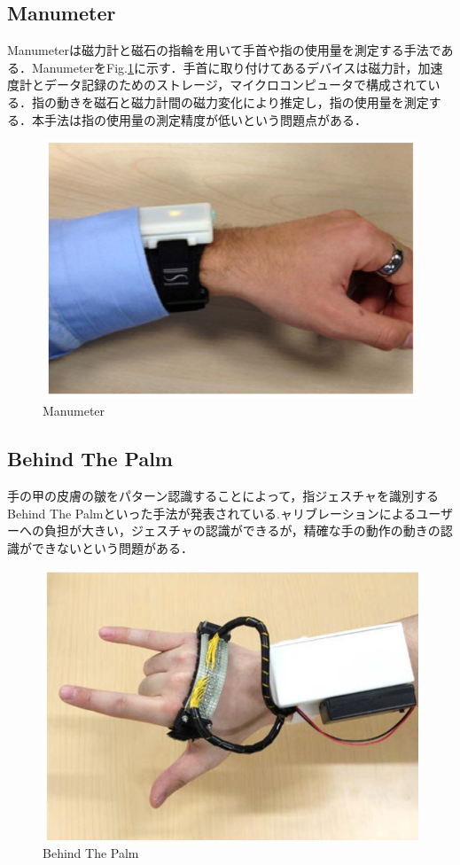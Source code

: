 \subsection*{Manumeter}
Manumeter\cite{Friedman2014}は磁力計と磁石の指輪を用いて手首や指の使用量を測定する手法である．ManumeterをFig.\ref{fig:Manumeter}に示す．手首に取り付けてあるデバイスは磁力計，加速度計とデータ記録のためのストレージ，マイクロコンピュータで構成されている．指の動きを磁石と磁力計間の磁力変化により推定し，指の使用量を測定する．本手法は指の使用量の測定精度が低いという問題点がある．
\begin{figure}[H]
  \centering
  \includegraphics[width=0.6\linewidth]{fig/ch1/manumeter}
  \caption{Manumeter}
  \label{fig:Manumeter}
\end{figure}

\subsection*{Behind The Palm}
手の甲の皮膚の皺をパターン認識することによって，指ジェスチャを識別するBehind The Palm\cite{Recognition2017}といった手法が発表されている.ャリブレーションによるユーザーへの負担が大きい，ジェスチャの認識ができるが，精確な手の動作の動きの認識ができないという問題がある．
\begin{figure}[H]
  \centering
  \includegraphics[width=0.6\linewidth]{fig/ch1/btp}
  \caption{Behind The Palm}
  \label{fig:Behind The Palm}
\end{figure}

